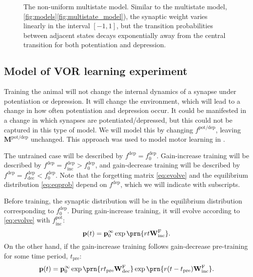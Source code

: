 \documentclass[12pt]{article}
\newcommand{\pr}{\mathbf{p}}
\newcommand{\eq}{\pr^\infty}
\newcommand{\W}{\mathbf{W}}
\newcommand{\frg}{\W^\mathrm{F}}
\newcommand{\M}{\mathbf{M}}
\newcommand{\pot}{^{\text{pot}}}
\newcommand{\dep}{^{\text{dep}}}
\newcommand{\potdep}{^{\text{pot/dep}}}
\newcommand{\norm}{_0}
\newcommand{\inc}{_{\text{inc}}}
\newcommand{\dec}{_{\text{dec}}}
\newcommand{\tpre}{t_{\text{pre}}}
\begin{document}
\begin{figure}
 \begin{center}
 \end{center}
  \caption[The non-uniform multistate model]{The non-uniform multistate model.
  Similar to the multistate model, \autoref{fig:models}\ref{fig:multistate_model}), the synaptic weight varies linearly in the interval $[-1,1]$, but the transition probabilities between adjacent states decays exponentially away from the central transition for both potentiation and depression.} \label{fig:nonuni_model}
\end{figure}



\subsection{Model of VOR learning experiment}\label{sec:learning}

Training the animal will not change the internal dynamics of a synapse under potentiation or depression.
It will change the environment, which will lead to a change in how often potentiation and depression occur.
It could be manifested in a change in which synapses are potentiated/depressed, but this could not be captured in this type of model.
We will model this by changing $f\potdep$, leaving $\M\potdep$ unchanged.
This approach was used to model motor learning in \cite{Smith2006savings}.

The untrained case will be described by $f\dep=f\dep\norm$.
Gain-increase training  will be described by $f\dep=f\dep\inc>f\dep\norm$, and
gain-decrease training  will be described by $f\dep=f\dep\dec<f\dep\norm$.
Note that the forgetting matrix \eqref{eq:evolve} and the equilibrium distribution \eqref{eq:eqprob} depend on $f\dep$, which we will indicate with subscripts.

Before training, the synaptic distribution will be in the equilibrium distribution corresponding to $f\dep\norm$.
During gain-increase training, it will evolve according to \eqref{eq:evolve} with $f\pot\inc$:
%
\begin{equation}\label{eq:nopre}
  \pr(t) = \eq\norm \exp\prn{rt\frg\inc}.
\end{equation}
%
On the other hand, if the gain-increase training follows gain-decrease pre-training for some time period, $\tpre$:
%
\begin{equation}\label{eq:withpre}
  \pr(t) = \eq\norm \exp\prn{r\tpre\frg\dec} \exp\prn{r(t-\tpre)\frg\inc}.
\end{equation}
%
\end{document}
